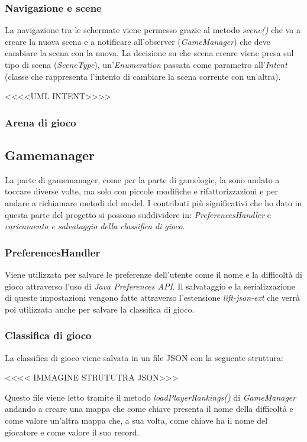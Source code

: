 \subsubsection{Navigazione e scene}
La navigazione tra le schermate viene permesso grazie al metodo \textit{scene\textunderscore()} che va a creare la nuova scena e a notificare all'observer (\textit{GameManager}) che deve cambiare la scena con la nuova.
La decisione su che scena creare viene presa sul tipo di scena (\textit{SceneType}), un'\textit{Enumeration} passata come parametro all'\textit{Intent} (classe che rappresenta l'intento di cambiare la scena corrente con un'altra). 

<<<<UML INTENT>>>>

\subsubsection{Arena di gioco}


\subsection{Gamemanager}
La parte di gamemanager, come per la parte di gamelogic, la sono andato a toccare diverse volte, ma solo con piccole modifiche e rifattorizzazioni e per andare a richiamare metodi del model.
I contributi più significativi che ho dato in questa parte del progetto si possono suddividere in: \textit{PreferencesHandler} e \textit{caricamento e salvataggio della classifica di gioco}.

\subsubsection{PreferencesHandler}
Viene utilizzata per salvare le preferenze dell'utente come il nome e la difficoltà di gioco attraverso l'uso di \textit{Java Preferences API}.
Il salvataggio e la serializzazione di queste impostazioni vengono fatte attraverso l'estensione \textit{lift-json-ext} che verrà poi utilizzata anche per salvare la classifica di gioco.

\subsubsection{Classifica di gioco}
La classifica di gioco viene salvata in un file JSON con la seguente struttura:

<<<< IMMAGINE STRUTUTRA JSON>>>

Questo file viene letto tramite il metodo \textit{loadPlayerRankings()} di \textit{GameManager} andando a creare una mappa che come chiave presenta il nome della difficoltà e come valore un'altra mappa che, a sua volta, come chiave ha il nome del giocatore e come valore il suo record.

